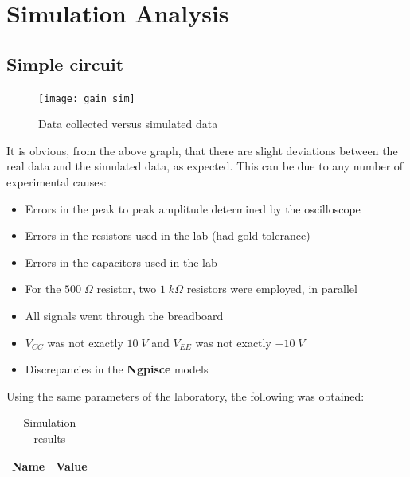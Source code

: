 \newpage

\section{Simulation Analysis}
\label{sec:simulation}

\subsection{Simple circuit}

\begin{figure}[H]
\centering
\texttt{[image: gain\_sim]}
\caption{Data collected versus simulated data}
\label{data_graph_sim}
\end{figure}

It is obvious, from the above graph, that there are slight deviations between the real data and the simulated data, as expected. This can be due to any number of experimental causes:

\begin{itemize}

\item Errors in the peak to peak amplitude determined by the oscilloscope

\item Errors in the resistors used in the lab (had gold tolerance)

\item Errors in the capacitors used in the lab

\item For the $500\;\Omega$ resistor, two $1\;k\Omega$ resistors were employed, in parallel

\item All signals went through the breadboard

\item $V_{CC}$ was not exactly $10\;V$ and $V_{EE}$ was not exactly $-10\;V$

\item Discrepancies in the {\bf Ngpisce} models

\end{itemize}

Using the same parameters of the laboratory, the following was obtained:

\begin{table}[H]
  \centering
  \begin{tabular}{|c|c|}
    \hline
        {\bf Name} & {\bf Value} \\
        \hline
        \hline
        
        \hline
  \end{tabular}
  \caption{Simulation results}
  \label{sim_results}
\end{table}

